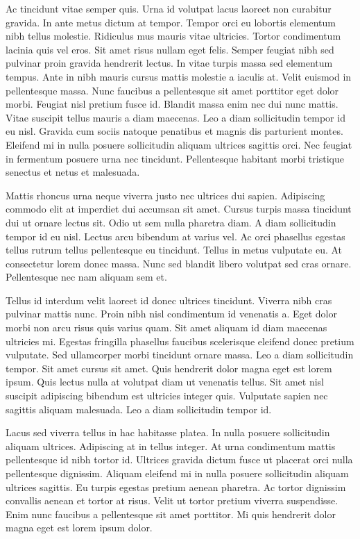 \documentclass[conference]{IEEEtran}
\begin{document}
Ac tincidunt vitae semper quis. Urna id volutpat lacus laoreet non curabitur gravida. In ante metus dictum at tempor. Tempor orci eu lobortis elementum nibh tellus molestie. Ridiculus mus mauris vitae ultricies. Tortor condimentum lacinia quis vel eros. Sit amet risus nullam eget felis. Semper feugiat nibh sed pulvinar proin gravida hendrerit lectus. In vitae turpis massa sed elementum tempus. Ante in nibh mauris cursus mattis molestie a iaculis at. Velit euismod in pellentesque massa. Nunc faucibus a pellentesque sit amet porttitor eget dolor morbi. Feugiat nisl pretium fusce id. Blandit massa enim nec dui nunc mattis. Vitae suscipit tellus mauris a diam maecenas. Leo a diam sollicitudin tempor id eu nisl. Gravida cum sociis natoque penatibus et magnis dis parturient montes. Eleifend mi in nulla posuere sollicitudin aliquam ultrices sagittis orci. Nec feugiat in fermentum posuere urna nec tincidunt. Pellentesque habitant morbi tristique senectus et netus et malesuada.

Mattis rhoncus urna neque viverra justo nec ultrices dui sapien. Adipiscing commodo elit at imperdiet dui accumsan sit amet. Cursus turpis massa tincidunt dui ut ornare lectus sit. Odio ut sem nulla pharetra diam. A diam sollicitudin tempor id eu nisl. Lectus arcu bibendum at varius vel. Ac orci phasellus egestas tellus rutrum tellus pellentesque eu tincidunt. Tellus in metus vulputate eu. At consectetur lorem donec massa. Nunc sed blandit libero volutpat sed cras ornare. Pellentesque nec nam aliquam sem et.

Tellus id interdum velit laoreet id donec ultrices tincidunt. Viverra nibh cras pulvinar mattis nunc. Proin nibh nisl condimentum id venenatis a. Eget dolor morbi non arcu risus quis varius quam. Sit amet aliquam id diam maecenas ultricies mi. Egestas fringilla phasellus faucibus scelerisque eleifend donec pretium vulputate. Sed ullamcorper morbi tincidunt ornare massa. Leo a diam sollicitudin tempor. Sit amet cursus sit amet. Quis hendrerit dolor magna eget est lorem ipsum. Quis lectus nulla at volutpat diam ut venenatis tellus. Sit amet nisl suscipit adipiscing bibendum est ultricies integer quis. Vulputate sapien nec sagittis aliquam malesuada. Leo a diam sollicitudin tempor id.

Lacus sed viverra tellus in hac habitasse platea. In nulla posuere sollicitudin aliquam ultrices. Adipiscing at in tellus integer. At urna condimentum mattis pellentesque id nibh tortor id. Ultrices gravida dictum fusce ut placerat orci nulla pellentesque dignissim. Aliquam eleifend mi in nulla posuere sollicitudin aliquam ultrices sagittis. Eu turpis egestas pretium aenean pharetra. Ac tortor dignissim convallis aenean et tortor at risus. Velit ut tortor pretium viverra suspendisse. Enim nunc faucibus a pellentesque sit amet porttitor. Mi quis hendrerit dolor magna eget est lorem ipsum dolor.
\end{document}
